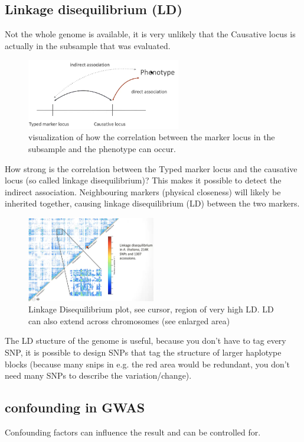 \documentclass{article}
\begin{document}
\subsection{Linkage disequilibrium (LD)}
Not the whole genome is available, it is very unlikely that the Causative locus is actually in the subsample that was evaluated.

\begin{figure}[H]
\centering
\includegraphics[width = 0.6\textwidth]{gwa/linkage-equilibrium.png}
\caption{visualization of how the correlation between the marker locus in the subsample and the phenotype can occur.}
\end{figure}
How strong is the correlation between the Typed marker locus and the causative locus (so called linkage disequilibrium)? This makes it possible to detect the indirect association. Neighbouring markers (physical closeness) will likely be inherited together, causing linkage disequilibrium (LD) between the two markers. 

\begin{figure}[H]
\centering
\includegraphics[width = 0.5\textwidth]{gwa/ld-plot.png}
\caption{Linkage Disequilibrium plot, see cursor, region of very high LD. LD can also extend across chromosomes (see enlarged area)}
\end{figure}
The LD stucture of the genome is useful, because you don't have to tag every SNP, it is possible to design SNPs that tag the structure of larger haplotype blocks (because many snips in e.g. the red area would be redundant, you don't need many SNPs to describe the variation/change).

\subsection{confounding in GWAS}
Confounding factors can influence the result and can be controlled for.
\end{document}
